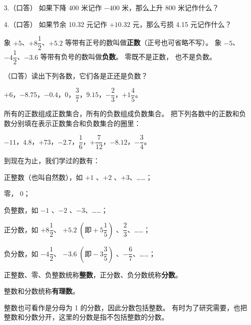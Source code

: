3.（口答） 如果下降 400 米记作 $-400$ 米，那么上升 800 米记作什么？

4.（口答） 如果节余 10.32 元记作 $+10.32$ 元，那么亏损 4.15 元记作什么？

\jiange

\begin{enhancedline}
象 $+5$、$+8\dfrac{1}{2}$、$+5.2$ 等带有正号的数叫做\textbf{正数}（正号也可省略不写）。
象 $-5$、$-4\dfrac{1}{2}$、$-3.6$ 等带有负号的数叫做\textbf{负数}。
零既不是正数， 也不是负数。
\end{enhancedline}

\lianxi
（口答）读出下列各数，它们各是正还是负数？

\begin{enhancedline}
$+6$，$-8.75$，$-0.4$，$0$，$\dfrac{3}{7}$，$9.15$，$-\dfrac{2}{3}$，$+1\dfrac{4}{5}$。

\jiange

\liti[0] 所有的正数组成正数集合，所有的负数组成负数集合。
把下列各数中的正数和负数分别填在表示正数集合和负数集合的圈里：

$-11$，$4.8$，$+73$，$-2.7$，$\dfrac{1}{6}$，$+\dfrac{7}{12}$，$-8.12$，$-\dfrac{3}{4}$。
\end{enhancedline}

\begin{figure}[htbp]
    \centering
    
    \caption{}\label{fig:1-3}
\end{figure}

\jie
\begin{figure}[htbp]
    \centering
    
    \caption{}\label{fig:1-4}
\end{figure}

到现在为止，我们学过的数有：

正整数（也叫自然数），如 $+1$ 、$+2$ 、$+3$、……；

零， $0$；

负整数，如 $-1$ 、$-2$ 、$-3$、……；

\begin{enhancedline}
正分数，如 $+8\dfrac{1}{2}$、 $+5.2 \; \left( \text{即} +5\dfrac{1}{5} \right)$ 、$\dfrac{2}{3}$、……；

负分数，如 $-4\dfrac{1}{2}$、 $-3.6 \; \left( \text{即} -3\dfrac{3}{5} \right)$ 、$-\dfrac{6}{7}$、……；

正整数、零、负整数统称\textbf{整数}，正分数、负分数统称\textbf{分数}。
\end{enhancedline}

整数和分数统称\textbf{有理数}。

\zhuyi 整数也可看作是分母为 1 的分数，因此分数包括整数。
有时为了研究需要，也把整数和分数分开，这里的分数是指不包括整数的分数。


\lianxi
\begin{xiaotis}
\begin{enhancedline}

\end{enhancedline}
\end{xiaotis}

